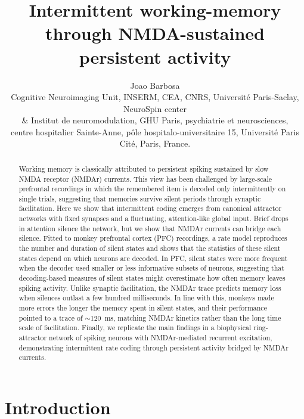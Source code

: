 \documentclass[11pt]{article}
\title{Intermittent working-memory through NMDA-sustained persistent activity}
\author{Joao Barbosa\\[4pt]
\small Cognitive Neuroimaging Unit, INSERM, CEA, CNRS, Universit\'e Paris-Saclay, NeuroSpin center\\ \small \& Institut de neuromodulation, GHU Paris, psychiatrie et neurosciences,\\ \small centre hospitalier Sainte-Anne, p\^ole hospitalo-universitaire 15, Universit\'e Paris Cit\'e, Paris, France.}
\date{}
\begin{document}
\maketitle

\begin{abstract}
Working memory is classically attributed to persistent spiking sustained by slow NMDA receptor (NMDAr) currents. This view has been challenged by large-scale prefrontal recordings in which the remembered item is decoded only intermittently on single trials, suggesting that memories survive silent periods through synaptic facilitation. Here we show that intermittent coding emerges from canonical attractor networks with fixed synapses and a fluctuating, attention-like global input. Brief drops in attention silence the network, but we show that NMDAr currents can bridge each silence. Fitted to monkey prefrontal cortex (PFC) recordings, a rate model reproduces the number and duration of silent states and shows that the statistics of these silent states depend on which neurons are decoded. In PFC, silent states were more frequent when the decoder used smaller or less informative subsets of neurons, suggesting that decoding-based measures of silent states might overestimate how often memory leaves spiking activity. Unlike synaptic facilitation, the NMDAr trace predicts memory loss when silences outlast a few hundred milliseconds. In line with this, monkeys made more errors the longer the memory spent in silent states, and their performance pointed to a trace of $\sim$120~ms, matching NMDAr kinetics rather than the long time scale of facilitation. Finally, we replicate the main findings in a biophysical ring-attractor network of spiking neurons with NMDAr-mediated recurrent excitation, demonstrating intermittent rate coding through persistent activity bridged by NMDAr currents.

\end{abstract}

\section{Introduction}
\end{document}
